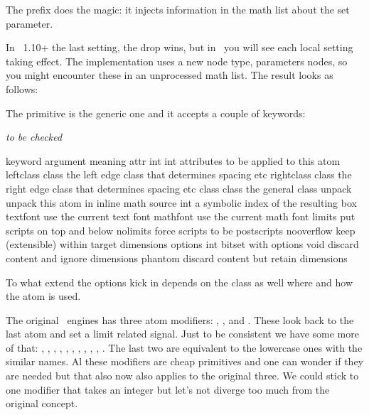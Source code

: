 \typebuffer

The \type {\frozen} prefix does the magic: it injects information in the
math list about the set parameter.

In \LUATEX\ 1.10+ the last setting, the \type {10pt} drop wins, but in
\LUAMETATEX\ you will see each local setting taking effect. The implementation
uses a new node type, parameters nodes, so you might encounter these in an
unprocessed math list. The result looks as follows:

\blank \getbuffer \blank

The \type {\mathatom} primitive is the generic one and it accepts a couple of
keywords:

{\em to be checked}

\starttabulate[|lT|l|l|]
\FL
\BC keyword    \BC argument \NC meaning \NC \NR
\TL
\NC attr       \NC int int \NC attributes to be applied to this atom \NC \NR
\NC leftclass  \NC class   \NC the left edge class that determines spacing etc \NC \NR
\NC rightclass \NC class   \NC the right edge class that determines spacing etc \NC \NR
\NC class      \NC class   \NC the general class \NC \NR
\NC unpack     \NC         \NC unpack this atom in inline math \NC \NR
\NC source     \NC int     \NC a symbolic index of the resulting box \NC \NR
\NC textfont   \NC         \NC use the current text font \NC \NR
\NC mathfont   \NC         \NC use the current math font \NC \NR
\NC limits     \NC         \NC put scripts on top and below \NC \NR
\NC nolimits   \NC         \NC force scripts to be postscripts \NC \NR
\NC nooverflow \NC         \NC keep (extensible) within target dimensions \NC \NR
\NC options    \NC int     \NC bitset with options \NC \NR
\NC void       \NC         \NC discard content and ignore dimensions \NC \NR
\NC phantom    \NC         \NC discard content but retain dimensions \NC \NR
\LL
\stoptabulate

To what extend the options kick in depends on the class as well where and how the
atom is used.

The original \TEX\ engines has three atom modifiers: \type {\displaylimits}, \type
{\limits}, and \type {\nolimits}. These look back to the last atom and set a limit
related signal. Just to be consistent we have some more of that: \typ
{\Umathadapttoleft}, \typ {\Umathadapttoright}, \typ {\Umathuseaxis}, \typ
{\Umathnoaxis}, \typ {\Umathphantom}, \typ {\Umathvoid}, \typ {\Umathsource}, \typ
{\Umathopenupheight}, \typ {\Umathopenupdepth}, \typ {\Umathlimits}, \typ
{\Umathnolimits}. The last two are equivalent to the lowercase ones with the
similar names. Al these modifiers are cheap primitives and one can wonder if they
are needed but that also now also applies to the original three. We could stick
to one modifier that takes an integer but let's not diverge too much from the
original concept.

